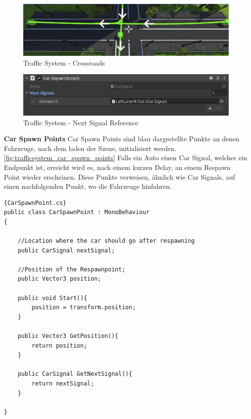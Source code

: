 \begin{figure}
    \centering
    \includegraphics[scale=0.5]{pics/trafficsystem_carsignal_crossroads}
    \caption{Traffic System - Crossroads}
    \label{fig:trafficsystem_crossroads}
\end{figure}

\begin{figure}
    \centering
    \includegraphics[scale=0.7]{pics/trafficsystem_carsignal_signal_reference}
    \caption{Traffic System - Next Signal Reference}
    \label{fig:trafficsystem_next_signal_reference}
\end{figure}


\textbf{Car Spawn Points}
Car Spawn Points sind blau dargestellte Punkte an denen Fahrzeuge, nach dem laden der Szene, initialisiert werden.
\ref{fig:trafficsystem_car_spawn_points}
Falls ein Auto einen Car Signal, welcher ein Endpunkt ist, erreicht wird es, nach einem kurzen Delay, an einem Respawn Point wieder erscheinen.
Diese Punkte verweisen, \"ahnlich wie Car Signals, auf einen nachfolgenden Punkt, wo die Fahrzeuge hinfahren.

\begin{lstlisting}{CarSpawnPoint.cs}
public class CarSpawnPoint : MonoBehaviour
{

    //Location where the car should go after respawning
    public CarSignal nextSignal;

    //Position of the Respawnpoint;
    public Vector3 position;

    public void Start(){
        position = transform.position;
    }

    public Vector3 GetPosition(){
        return position;
    }

    public CarSignal GetNextSignal(){
        return nextSignal;
    }

}
\end{lstlisting}

